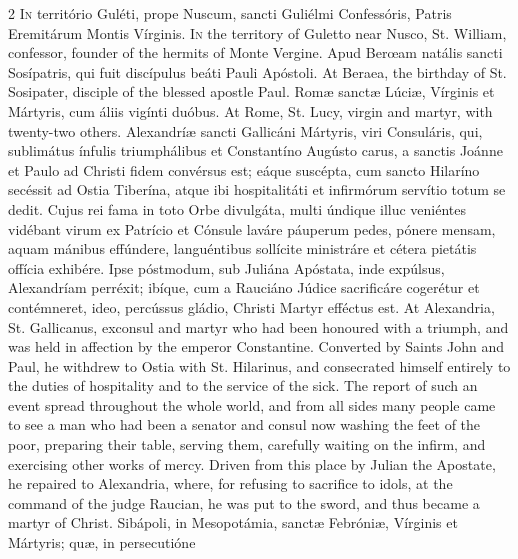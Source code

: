 \begin{paracol}{2}
\lettrine[lines=2]{I}{n} território Guléti, 
 prope Nuscum, sancti Guliélmi Confessóris, Patris Eremitárum Montis Vírginis.
\switchcolumn
{}
\lettrine[lines=2]{I}{n} the territory of Guletto near 
 Nusco, St. William, confessor, founder of the hermits of Monte Vergine.
\switchcolumn*
{}
Apud Berœam natális 
 sancti Sosípatris, qui fuit discípulus beáti Pauli Apóstoli.
\switchcolumn
{}
At Beraea, the birthday of St. 
 Sosipater, disciple of the blessed apostle Paul.
\switchcolumn*
{}
Romæ sanctæ Lúciæ, 
 Vírginis et Mártyris, cum áliis vigínti duóbus.
\switchcolumn
{}
At Rome, St. Lucy, virgin and 
 martyr, with twenty-two others.
\switchcolumn*
{}
Alexandríæ sancti 
 Gallicáni Mártyris, viri Consuláris, qui, sublimátus ínfulis triumphálibus 
 et Constantíno Augústo carus, a sanctis Joánne et Paulo ad Christi fidem 
 convérsus est; eáque suscépta, cum sancto Hilaríno secéssit ad Ostia 
 Tiberína, atque ibi hospitalitáti et infirmórum servítio totum se dedit. 
 Cujus rei fama in toto Orbe divulgáta, multi úndique illuc veniéntes 
 vidébant virum ex Patrício et Cónsule laváre páuperum pedes, pónere mensam, 
 aquam mánibus effúndere, languéntibus sollícite ministráre et cétera pietátis offícia exhibére. Ipse póstmodum, sub Juliána Apóstata, inde 
 expúlsus, Alexandríam perréxit; ibíque, cum a Rauciáno Júdice sacrificáre 
 cogerétur et contémneret, ideo, percússus gládio, Christi Martyr efféctus 
 est.
\switchcolumn
{}
At Alexandria, St. Gallicanus, 
 exconsul and martyr who had been honoured with a triumph, and was held in 
 affection by the emperor Constantine. Converted by Saints John and 
 Paul, he withdrew to Ostia with St. Hilarinus, and consecrated himself 
 entirely to the duties of hospitality and to the service of the sick. 
 The report of such an event spread throughout the whole world, and from all 
 sides many people came to see a man who had been a senator and consul now 
 washing the feet of the poor, preparing their table, serving them, carefully 
 waiting on the infirm, and exercising other works of mercy. Driven 
 from this place by Julian the Apostate, he repaired to Alexandria, where, 
 for refusing to sacrifice to idols, at the command of the judge Raucian, he 
 was put to the sword, and thus became a martyr of Christ.
\switchcolumn*
{}
Sibápoli, in 
 Mesopotámia, sanctæ Febróniæ, Vírginis et Mártyris; quæ, in persecutióne 

\end{paracol}
